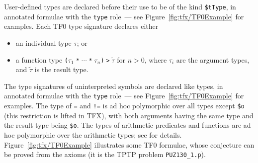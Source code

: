 User-defined types are declared before their use to be of the kind
{\tt \$tType}, in annotated formulae with the {\tt type} role~--- see
Figure~\ref{fig:tfx/TF0Example} for examples.
Each TF0 type signature declares either
\begin{itemize}
\item an individual type $\tau$; or
\item a function type {\tt ($\tau_1\;$*$\;{\cdots}\;$*$\;\tau_n$)$\;$>$\;\tilde \tau$}
      for $n > 0$, where $\tau_i$ are the argument types, and $\tilde \tau$
      is the result type.
\end{itemize}

The type signatures of uninterpreted symbols are declared like types, in
annotated formulae with the {\tt type} role~--- see Figure~\ref{fig:tfx/TF0Example}
for examples.
The type of {\tt =} and {\tt !=} is ad hoc polymorphic over all types 
except {\tt \$o} (this restriction is lifted in TFX), with both arguments 
having the same type and the result type being {\tt \$o}.
The types of arithmetic predicates and functions are ad hoc polymorphic
over the arithmetic types; see \cite{tff0} for details.
Figure~\ref{fig:tfx/TF0Example} illustrates some TF0 formulae, whose conjecture can
be proved from the axioms (it is the TPTP problem {\tt PUZ130\_1.p}).

